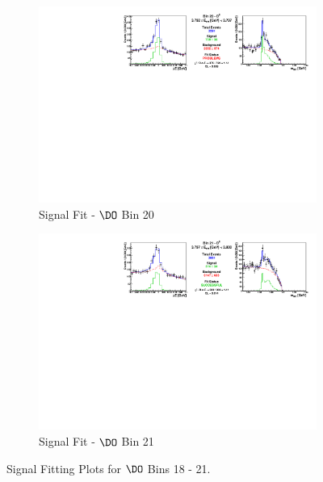 \begin{figure}[h]
\begin{subfigure}[c]{0.99\textwidth}
\includegraphics[width=\textwidth]{figures/plots/fit_results/D0_bin_20.pdf}
\caption*{Signal Fit - $\DO$ Bin 20}
\end{subfigure}

\vspace{5pt}

\begin{subfigure}[c]{0.99\textwidth}
\includegraphics[width=\textwidth]{figures/plots/fit_results/D0_bin_21.pdf}
\caption*{Signal Fit - $\DO$ Bin 21}
\end{subfigure}

\caption{Signal Fitting Plots for $\DO$ Bins 18 - 21.}
\label{fig:DO_plots_18_21}

\end{figure}


